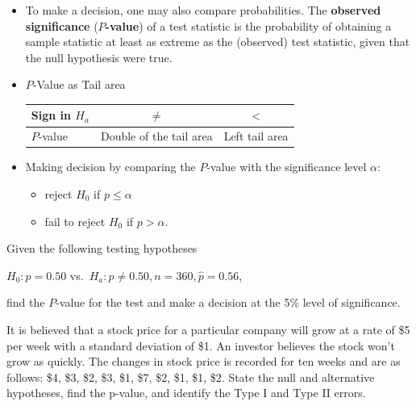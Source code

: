 \begin{itemize}
\item
  To make a decision, one may also compare probabilities. The
  \textbf{observed significance} (\textbf{$P$-value}) of a test statistic is the probability of obtaining a sample statistic at least as extreme as the (observed) test statistic, given that the null hypothesis were true.
\item
  \(P\)-Value as Tail area

  \begin{longtable}[]{@{}lcc@{}}
  \toprule()
  Sign in \(H_a\) & \(\ne\) & \(<\) \\
  \midrule()
  \endhead
  \(P\)-value & Double of the tail area & Left tail area \\
  \bottomrule()
  \end{longtable}
\item
  Making decision by comparing the \(P\)-value with the significance
  level \(\alpha\):

  \begin{itemize}
  \item
    reject \(H_0\) if \(p\le \alpha\)
  \item
    fail to reject \(H_0\) if \(p>\alpha\).
  \end{itemize}
\end{itemize}

\begin{example}

Given the following testing hypotheses

\(H_{0}: p=0.50\) vs.~\(H_{a}: p\ne 0.50, n=360, \hat{p}=0.56\),

find the \(P\)-value for the test and make a decision at the 5\% level
of significance.

\end{example}
\vspace*{8\baselineskip}

\begin{example}

It is believed that a stock price for a particular company will grow at
a rate of \$5 per week with a standard deviation of \$1. An investor
believes the stock won't grow as quickly. The changes in stock price is
recorded for ten weeks and are as follows: \$4, \$3, \$2, \$3, \$1, \$7,
\$2, \$1, \$1, \$2. State the null and alternative hypotheses, find the
p-value, and identify the Type I and Type II errors.

\end{example}
\vspace*{8\baselineskip}

